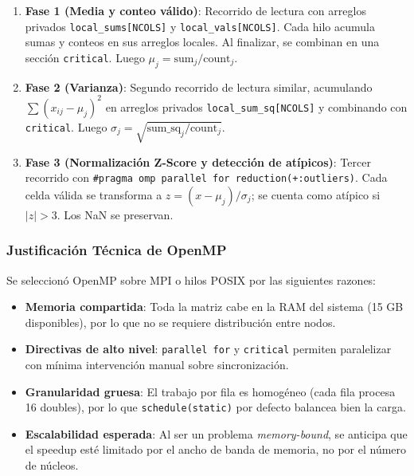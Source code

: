 \documentclass[10pt,a4paper]{article}
\begin{document}
\begin{enumerate}
    \item \textbf{Fase 1 (Media y conteo v\'alido)}: Recorrido de lectura con
        arreglos privados \texttt{local\_sums[NCOLS]} y
        \texttt{local\_vals[NCOLS]}. Cada hilo acumula sumas y conteos en sus
        arreglos locales. Al finalizar, se combinan en una secci\'on
        \texttt{critical}. Luego $\mu_j = \text{sum}_j / \text{count}_j$.
    \item \textbf{Fase 2 (Varianza)}: Segundo recorrido de lectura similar,
        acumulando $\sum (x_{ij} - \mu_j)^2$ en arreglos privados
        \texttt{local\_sum\_sq[NCOLS]} y combinando con \texttt{critical}.
        Luego $\sigma_j = \sqrt{\text{sum\_sq}_j / \text{count}_j}$.
    \item \textbf{Fase 3 (Normalizaci\'on Z-Score y detecci\'on de at\'ipicos)}:
        Tercer recorrido con \texttt{\#pragma omp parallel for
        reduction(+:outliers)}. Cada celda v\'alida se transforma a
        $z = (x - \mu_j) / \sigma_j$; se cuenta como at\'ipico si
        $|z| > 3$. Los NaN se preservan.
\end{enumerate}

\subsubsection{Justificaci\'on T\'ecnica de OpenMP}

Se seleccion\'o OpenMP sobre MPI o hilos POSIX por las siguientes razones:

\begin{itemize}
    \item \textbf{Memoria compartida}: Toda la matriz cabe en la RAM del sistema
        (15 GB disponibles), por lo que no se requiere distribuci\'on entre nodos.
    \item \textbf{Directivas de alto nivel}: \texttt{parallel for} y
        \texttt{critical} permiten paralelizar con m\'inima intervenci\'on
        manual sobre sincronizaci\'on.
    \item \textbf{Granularidad gruesa}: El trabajo por fila es homog\'eneo
        (cada fila procesa 16 doubles), por lo que \texttt{schedule(static)}
        por defecto balancea bien la carga.
    \item \textbf{Escalabilidad esperada}: Al ser un problema
        \emph{memory-bound}, se anticipa que el speedup est\'e limitado por el
        ancho de banda de memoria, no por el n\'umero de n\'ucleos.
\end{itemize}
\end{document}
